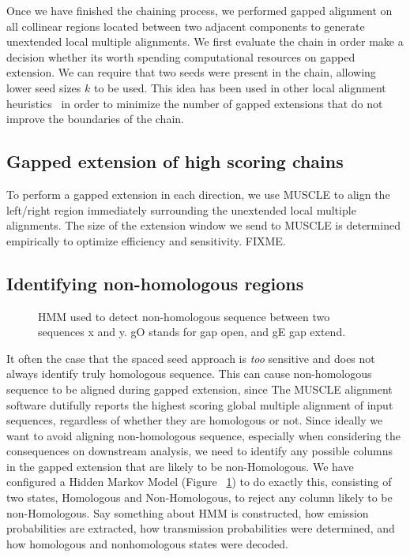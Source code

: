 \documentclass{ws-procs9x6}
\begin{document}
Once we have finished the chaining process, we performed gapped alignment on all collinear regions located between two adjacent components to generate unextended local multiple alignments. We first evaluate the chain in order make a decision whether its worth spending computational resources on gapped extension. We can require that two seeds were present in the chain, allowing lower seed sizes $k$ to be used. This idea has been used in other local alignment heuristics~\cite{ref-blastz,ref-gappedblast,ref-blat} in order to minimize the number of gapped extensions that do not improve the boundaries of the chain.

\subsection{Gapped extension of high scoring chains}

To perform a gapped extension in each direction, we use MUSCLE to align the left/right region immediately surrounding the unextended local multiple alignments. The size of the extension window we send to MUSCLE is determined empirically to optimize efficiency and sensitivity. FIXME.
\subsection{Identifying non-homologous regions}
\begin{figure}[t]
\centering {}
\caption{HMM used to detect non-homologous sequence between two sequences x and y. gO stands for gap open, and gE gap extend. }

\label{fig-hmm}\vspace{-0.2cm}
\end{figure}

It often the case that the spaced seed approach is \emph{too} sensitive and does not always identify truly homologous sequence. This can cause non-homologous sequence to be aligned during gapped extension, since The MUSCLE alignment software dutifully reports the highest scoring global multiple alignment of input sequences, regardless of whether they are homologous or not. Since ideally we want to avoid aligning non-homologous sequence, especially when considering the consequences on downstream analysis, we need to identify any possible columns in the gapped extension that are likely to be non-Homologous. We have configured a Hidden Markov Model (Figure ~\ref{fig-hmm}) to do exactly this, consisting of two states, Homologous and Non-Homologous, to reject any column likely to be non-Homologous. Say something about HMM is constructed, how emission probabilities are extracted, how transmission probabilities were determined, and how homologous and nonhomologous states were decoded.
\end{document}
